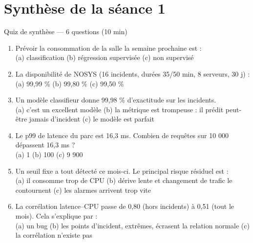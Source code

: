 \section{Synthèse de la séance 1}

\begin{frame}{Quiz de synthèse --- 6 questions (10 min)}
\footnotesize%
\begin{qbox}
\begin{enumerate}
\item Prévoir la consommation de la salle la semaine prochaine est :\\
(a) classification \quad (b) régression supervisée \quad (c) non supervisé
\item La disponibilité de NOSYS (16 incidents, durées 35/50 min, 8 serveurs, 30 j) :\\
(a) 99,99 \% \quad (b) 99,80 \% \quad (c) 99,50 \%
\item Un modèle classifieur donne 99,98 \% d'exactitude sur les incidents.\\
(a) c'est un excellent modèle \quad (b) la métrique est trompeuse : il
prédit peut-être jamais d'incident \quad (c) le modèle est parfait
\item Le p99 de latence du parc est 16,3 ms. Combien de requêtes sur
10 000 dépassent 16,3 ms ?\\
(a) 1 \quad (b) 100 \quad (c) 9 900
\item Un seuil fixe a tout détecté ce mois-ci. Le principal risque résiduel est :\\
(a) il consomme trop de CPU \quad (b) dérive lente et changement de trafic
le contournent \quad (c) les alarmes arrivent trop vite
\item La corrélation latence--CPU passe de 0,80 (hors incidents) à 0,51 (tout le mois).
Cela s'explique par :\\
(a) un bug \quad (b) les points d'incident, extrêmes, écrasent la relation normale
\quad (c) la corrélation n'existe pas
\end{enumerate}
\end{qbox}
\end{frame}

